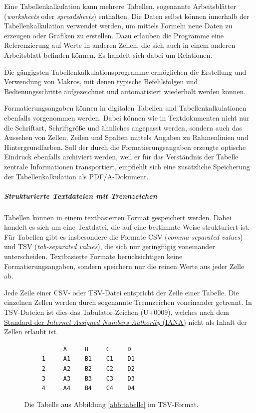 Eine Tabellenkalkulation kann mehrere Tabellen, sogenannte Arbeitsblätter (\emph{worksheets} oder \emph{spreadsheets}) enthalten. Die Daten selbst können innerhalb der Tabellenkalkulation verwendet werden, um mittels Formeln neue Daten zu erzeugen oder Grafiken zu erstellen. Dazu erlauben die Programme eine Referenzierung auf Werte in anderen Zellen, die sich auch in einem anderen Arbeitsblatt befinden können. Es handelt sich dabei um Relationen.

Die gängigsten Tabellenkalkulationsprogramme ermöglichen die Erstellung und Verwendung von Makros, mit denen typische Befehlsfolgen und Bedienungsschritte aufgezeichnet und automatisiert wiederholt werden können. 

Formatierungsangaben können in digitalen Tabellen und Tabellenkalkulationen ebenfalls vorgenommen werden. Dabei können wie in Textdokumenten nicht nur die Schriftart, Schriftgröße und ähnliches angepasst werden, sondern auch das Aussehen von Zellen, Zeilen und Spalten mittels Angaben zu Rahmenlinien und Hintergrundfarben. Soll der durch die Formatierungsangaben erzeugte optische Eindruck ebenfalls archiviert werden, weil er für das Verständnis der Tabelle zentrale Informationen transportiert, empfiehlt sich eine zusätzliche Speicherung der Tabellenkalkulation als PDF/A-Dokument.


\subparagraph{Strukturierte Textdateien mit Trennzeichen}
Tabellen können in einem textbasierten Format gespeichert werden. Dabei handelt es sich um eine Textdatei, die auf eine bestimmte Weise strukturiert ist. Für Tabellen gibt es insbesondere die Formate CSV (\emph{comma-separated values}) und TSV (\emph{tab-separated values}), die sich nur geringfügig voneinander unterscheiden. Textbasierte Formate berücksichtigen keine Formatierungsangaben, sondern speichern nur die reinen Werte aus jeder Zelle ab. 

Jede Zeile einer CSV- oder TSV-Datei entspricht der Zeile einer Tabelle. Die einzelnen Zellen werden durch sogenannte Trennzeichen voneinander getrennt. In TSV-Dateien ist dies das Tabulator-Zeichen (U+0009), welches nach dem \href{http://www.iana.org/assignments/media-types/text/tab-separated-values}{Standard der \emph{Internet Assigned Numbers Authority} (IANA)} nicht als Inhalt der Zellen erlaubt ist. 

\begin{figure}[!hbt]
  \begin{center}
\verb|           A     B     C     D|\\
\verb|     1     A1    B1    C1    D1|\\
\verb|     2     A2    B2    C2    D2|\\
\verb|     3     A3    B3    C3    D3|\\
\verb|     4     A4    B4    C4    D4|
  \end{center}
  \caption{Die Tabelle aus Abbildung \ref{abb:tabelle} im TSV-Format.}
	\label{abb:tabelle-tsv}
\end{figure}

